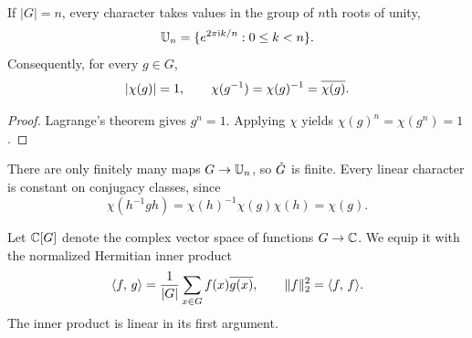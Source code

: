 
\begin{prop}
\label{prop-pte-elem-car}
\label{notation-2}\label{notation-3}\label{notation-4}\label{notation-5}
If $|G|=n$, every character takes values in the group of $n$th roots of unity,
\[
 \mathbb{U}_n=\{e^{2\pi\mathrm{i} k/n}:0\leq k<n\}.
\]
Consequently, for every $g\in G$,
\[
 |\chi(g)|=1,\qquad
 \chi(g^{-1})=\chi(g)^{-1}=\overline{\chi(g)}.
\]
\end{prop}
\begin{proof}
Lagrange's theorem gives $g^n=1$. Applying $\chi$ yields
$\chi(g)^n=\chi(g^n)=1$.
\end{proof}


\begin{rem}
There are only finitely many maps $G\to\mathbb{U}_n$, so $\hat{G}$ is finite.
Every linear character is constant on conjugacy classes, since
\begin{equation}
\label{eq-character-constant-class-conjug}
 \chi(h^{-1}gh)=\chi(h)^{-1}\chi(g)\chi(h)=\chi(g).
\end{equation}
\end{rem}


\begin{defn}[Functions on $G$]
\label{defn-space-function-g-in-c}
\label{notation-6}\label{notation-7}\label{notation-8}\label{notation-9}\label{notation-10}
Let $\mathbb{C}[G]$ denote the complex vector space of functions $G\to\mathbb{C}$.
We equip it with the normalized Hermitian inner product
\begin{equation}
\label{eq-defn-prod-herm-c-g-abelien}
 \langle f,\,g\rangle=\frac1{|G|}\sum_{x\in G}f(x)\overline{g(x)},
 \qquad \lVert f\rVert_2^2=\langle f,\,f\rangle.
\end{equation}
The inner product is linear in its first argument.
\end{defn}


